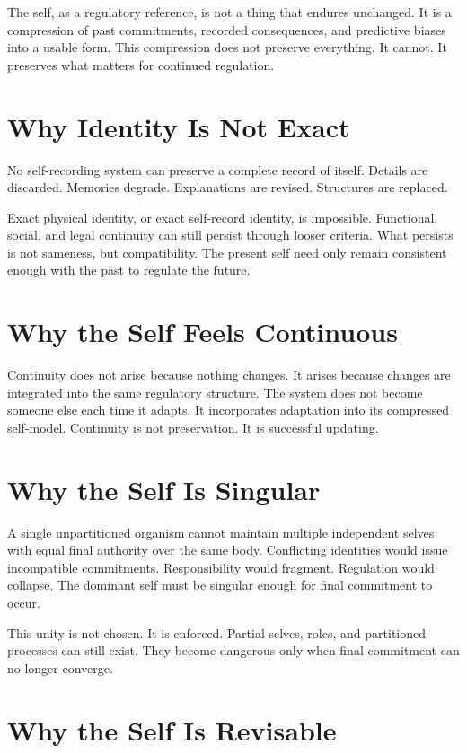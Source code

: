 \documentclass[11pt,twoside,openright]{book}
\begin{document}
The self, as a regulatory reference, is not a thing that endures unchanged. It is a compression of past commitments, recorded consequences, and predictive biases into a usable form. This compression does not preserve everything. It cannot. It preserves what matters for continued regulation.

\section*{Why Identity Is Not Exact}

No self-recording system can preserve a complete record of itself. Details are discarded. Memories degrade. Explanations are revised. Structures are replaced.

Exact physical identity, or exact self-record identity, is impossible. Functional, social, and legal continuity can still persist through looser criteria. What persists is not sameness, but compatibility. The present self need only remain consistent enough with the past to regulate the future.

\section*{Why the Self Feels Continuous}

Continuity does not arise because nothing changes. It arises because changes are integrated into the same regulatory structure. The system does not become someone else each time it adapts. It incorporates adaptation into its compressed self-model. Continuity is not preservation. It is successful updating.

\section*{Why the Self Is Singular}

A single unpartitioned organism cannot maintain multiple independent selves with equal final authority over the same body. Conflicting identities would issue incompatible commitments. Responsibility would fragment. Regulation would collapse. The dominant self must be singular enough for final commitment to occur.

This unity is not chosen. It is enforced. Partial selves, roles, and partitioned processes can still exist. They become dangerous only when final commitment can no longer converge.

\section*{Why the Self Is Revisable}
\end{document}

